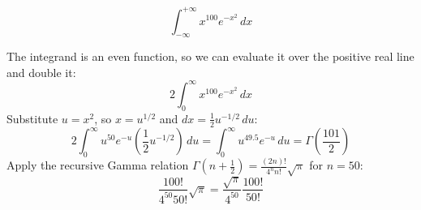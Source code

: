 \begin{questions}
    \question \[ \int_{-\infty}^{+\infty} x^{100} e^{-x^2} \,dx \]
    \begin{solution}
        The integrand is an even function, so we can evaluate it over the positive real line and double it:
        \[ 2 \int_0^\infty x^{100} e^{-x^2} \,dx \]
        Substitute $u = x^2$, so $x = u^{1/2}$ and $dx = \frac{1}{2} u^{-1/2} \,du$:
        \[ 2 \int_0^\infty u^{50} e^{-u} \left( \frac{1}{2} u^{-1/2} \right) \,du = \int_0^\infty u^{49.5} e^{-u} \,du = \Gamma\left(\frac{101}{2}\right) \]
        Apply the recursive Gamma relation $\Gamma\left(n + \frac{1}{2}\right) = \frac{(2n)!}{4^n n!}\sqrt{\pi}$ for $n = 50$:
        \[ \frac{100!}{4^{50}50!} \sqrt{\pi} = \frac{\sqrt{\pi}}{4^{50}} \frac{100!}{50!} \]
    \end{solution}
\end{questions}

